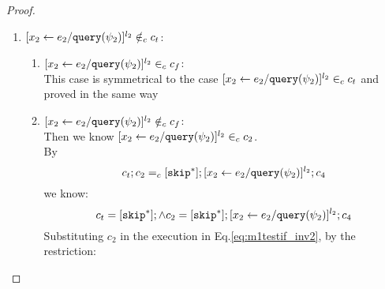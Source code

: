 \begin{proof}
\begin{case}
\begin{subcase}
\begin{subsubcase}
\begin{subproof}
\begin{enumerate}
\\
By definition of $\lvar$, we know:
\[
  x_2^{l_2} \in \lvar_{c_t}
\]
%
 By uniqueness of program label, we have:
 \[
 [\assign{{x}_2}{\expr_2 / \query(\qexpr_2)}]^{l_2} \notin_c c_f
 \]
 If $[\assign{{x}_2}{\expr_2 / \query(\qexpr_2)}]^{l_2} \notin_c c_2$,
we know $\forall \trace, \trace' \in \mathcal{T}$, there doesn't exist execution
 \[
  \config{c_f;c_2, \vtrace} \rightarrow^{*} 
  \config{[\assign{{x}_2}{\expr_2 / \query(\qexpr_2)}]^{l_2};{c}_4', \trace'}
 \]
 This is contradict to the existence of execution in Eq.\ref{eq:m1testif_inv2}.
 \\
 If $[\assign{{x}_2}{\expr_2 / \query(\qexpr_2)}]^{l_2} \in_c c_2$, 
 by uniqueness of label , 
 it must exist in the body of a while command in $c_2$,
 and $\eif ([b]^{l_b}, c_t, c_f) \in_c c_2$ and $[\assign{{x}_2}{\expr_2 / \query(\qexpr_2)}]^{l_2} \in_c c_t$. 
\\
%
i.e., $[\assign{{x}_2}{\expr_2 / \query(\qexpr_2)}]^{l_2}$ will only show up in $c_t$.
\\
%
By $\flowsto$ definition, we have:
\[
  \forall z_i^{r_i} \in \lvar_{c_t},  x_j^{l_j} \in \lvar_c \st x_j \in VAR(b) \land x_j^{l_j} \in \live^{l_b}(c) \implies
  \flowsto(x_j^{l_j}, z_i^{r_i}, c)
\]
%
Since $x_1 \in VAR(b)$ and $x_1^{l_1} \in \live^{l_b}(c)$, we know:
%
\[
\flowsto(x_1^{l_1}, x_2^{l_2}, c)
\]
%
i.e.,
\[
\Big(\exists z_1^{r_1}, \cdots, z_n^{r_n} \in \lvar_{{c}} \st 0 \leq n 
 \land \flowsto(x_1^{l_1}, z_1^{r_1}, c) \land \cdots \land \flowsto(z_n^{r_n}, {x}_2^{l_2}, c) \Big)
\]
%
This case is proved.
\item $[\mathrel{ {x}_2 \leftarrow e_2 / {\tt query}(\psi_2) }]^{l_2} \notin_c c_t$:
\begin{enumerate}
 \item $[\mathrel{ {x}_2 \leftarrow e_2 / {\tt query}(\psi_2) }]^{l_2} \in_c c_f$:
 \\
 This case is symmetrical to the case $[\assign{{x}_2}{\expr_2 / \query(\qexpr_2)}]^{l_2} \in_c c_t$ and proved in the same way
 \item $[\mathrel{ {x}_2 \leftarrow e_2 / {\tt query}(\psi_2) }]^{l_2} \notin_c c_f$:
 \\
 Then we know $[\assign{{x}_2}{\expr_2 / \query(\qexpr_2)}]^{l_2} \in_c c_2$.
 \\
 By
 \[
  c_t;c_2 =_c [\mathtt{skip}^*]; [\mathrel{ {x}_2 \leftarrow e_2 / {\tt query}(\psi_2) }]^{l_2};{c}_4
\]
we know:
\[
  c_t = [\mathtt{skip}^*]; \land c_2 = [\mathtt{skip}^*]; [\mathrel{ {x}_2 \leftarrow e_2 / {\tt query}(\psi_2) }]^{l_2};{c}_4
\]
Substituting $c_2$ in the execution in Eq.\ref{eq:m1testif_inv2}, by the restriction:

\end{enumerate}
\end{enumerate}
\end{subproof}
\end{subsubcase}
\end{subcase}
\end{case}
\end{proof}
